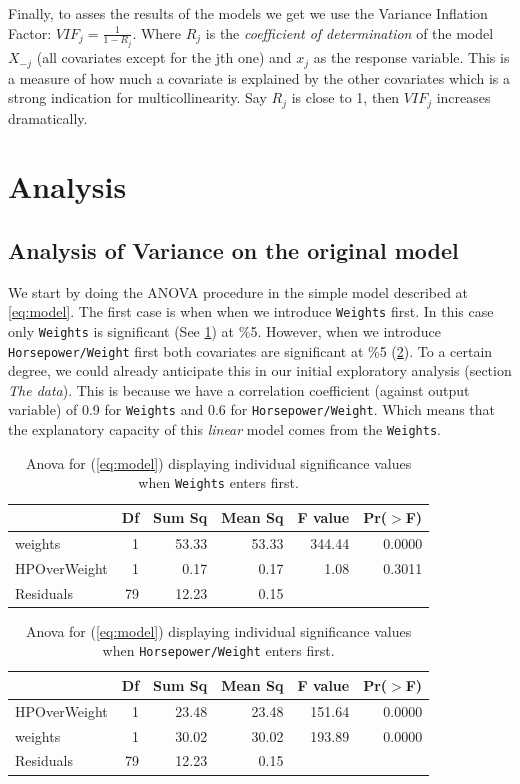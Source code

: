 \documentclass[12pt]{article}
\begin{document}
Finally, to asses the results of the models we get we use the Variance Inflation Factor:
$VIF_j = \frac{1}{1-R_j}$. Where $R_j$ is the \emph{coefficient of determination} of the model 
$X_{-j}$ (all covariates except for the jth one) and $x_j$ as the response variable.
This is a measure of how much a covariate is explained by the other covariates which is a strong
indication for multicollinearity. Say $R_j$ is close to 1, then $VIF_j$ increases dramatically.
\section{Analysis}\label{sec:themethod}
\subsection{Analysis of Variance on the original model}
We start by doing the ANOVA procedure in the simple model described at \ref{eq:model}.
The first case is when when we introduce \texttt{Weights} first. In this case
only \texttt{Weights} is significant (See \ref{tab:anova1}) at \%5. However, when
we introduce \texttt{Horsepower/Weight} first both covariates are significant at \%5 (\ref{tab:anova2}).
To a certain degree, we could already anticipate this in our initial exploratory analysis
(section \emph{The data}). This is because we have a correlation coefficient (against output variable) of 0.9 for \texttt{Weights} and 0.6 for \texttt{Horsepower/Weight}. Which means
that the explanatory capacity of this \emph{linear} model comes from the \texttt{Weights}. 
\begin{table}[h]
\centering
\caption{Anova for (\ref{eq:model}) displaying individual significance values when \texttt{Weights} enters first.}
\label{tab:anova1}
\begin{tabular}{|lrrrrr|}
  \hline
 & Df & Sum Sq & Mean Sq & F value & Pr($>$F) \\ 
  \hline
weights & 1 & 53.33 & 53.33 & 344.44 & 0.0000 \\ 
  HPOverWeight & 1 & 0.17 & 0.17 & 1.08 & 0.3011 \\ 
  Residuals & 79 & 12.23 & 0.15 &  &  \\ 
   \hline
\end{tabular}
\end{table}

\begin{table}[h]
\centering
\caption{Anova for (\ref{eq:model}) displaying individual significance values when \texttt{Horsepower/Weight} enters first.}
\label{tab:anova2}
\begin{tabular}{|lrrrrr|}
  \hline
 & Df & Sum Sq & Mean Sq & F value & Pr($>$F) \\ 
  \hline
HPOverWeight & 1 & 23.48 & 23.48 & 151.64 & 0.0000 \\ 
  weights & 1 & 30.02 & 30.02 & 193.89 & 0.0000 \\ 
  Residuals & 79 & 12.23 & 0.15 &  &  \\ 
   \hline
\end{tabular}
\end{table}
\end{document}

